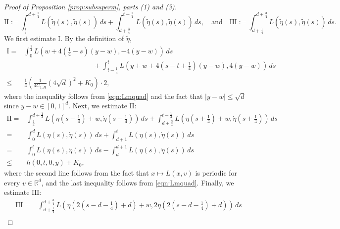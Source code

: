 \documentclass[reqno,11pt]{amsart}
\numberwithin{equation}{section}
\newcommand{\R}{\mathbb{R}} %
\begin{document}
\begin{proof}[Proof of Proposition \ref{prop:subsuperm}, parts (1) and (3)]
\[
\mathrm{II}:= \int_\frac{1}{4}^{d+\frac{1}{4}} L\left(\tilde{\eta}(s), \dot{\tilde{\eta}} (s)\right) \, ds+\int_{d+\frac{3}{4}}^{t-\frac{1}{4}}L\left(\tilde{\eta}(s), \dot{\tilde{\eta}} (s)\right) \, ds, \quad \text{and} \quad \mathrm{III}:=\int_{d+\frac{1}{4}}^{d+\frac{3}{4}}L\left(\tilde{\eta}(s), \dot{\tilde{\eta}} (s)\right) \, ds.
\]
We first estimate $\mathrm{I}$. By the definition of $\tilde{\eta}$,
\begin{equation}\label{eqn:tilxiIest}
\begin{aligned}
\mathrm{I} = &\int_0^\frac{1}{4} L\left(w+ 4\left(\frac{1}{4}-s\right)(y-w), -4(y-w)\right)\, ds\\
&\qquad \qquad\qquad\qquad\qquad +\int_{t-\frac{1}{4}}^t L\left(y+w +4\left(s-t+\frac{1}{4}\right)\left(y-w\right), 4(y-w)\right)\, ds\\
\leq &\frac{1}{4}  \left(\frac{1}{4C_{1,H}}\left(4 \sqrt{d}\right)^2+K_0\right)\cdot 2,
\end{aligned}
\end{equation}
where the inequality follows from \eqref{eqn:Lmquad} and the fact that $|y-w| \leq \sqrt{d}$ since $y-w \in [0, 1]^d$.
Next, we estimate $\mathrm{II}$:
\begin{equation}\label{eqn:tilxiIIest}
\begin{aligned}
\mathrm{II} =&\int_\frac{1}{4}^{d+\frac{1}{4}} L\left(\eta \left(s -\frac{1}{4}\right) +w, \dot{\eta} \left(s -\frac{1}{4}\right)\right)\, ds +\int_{d+\frac{3}{4}}^{t-\frac{1}{4}} L\left(\eta \left(s+\frac{1}{4}\right)+w, \dot{\eta} \left(s +\frac{1}{4}\right)\right)\, ds\\
= & \int_0^d L \left(\eta(s), \dot{\eta}(s)\right) \, ds+ \int_{d+1}^t L\left(\eta \left(s\right), \dot{\eta} \left(s \right)\right)\, ds\\
=& \int_0^t  L \left(\eta(s), \dot{\eta}(s)\right) \, ds - \int_d^{d+1}L\left(\eta \left(s\right), \dot{\eta} \left(s \right)\right)\, ds\\
\leq & h(0,t,0,y) +K_0,
\end{aligned}
\end{equation}
where the second line follows from the fact that $ x \mapsto L(x , v)$ is periodic for every $v \in \R^d$, and the last inequality follows from \eqref{eqn:Lmquad}. Finally, we estimate $\mathrm{III}$:
\begin{equation}\label{eqn:tilxiIIIest}
\begin{aligned}
\mathrm{III} = &\int_{d+\frac{1}{4}}^{d+\frac{3}{4}}L\left(\eta\left(2\left(s-d-\frac{1}{4}\right)+d\right)+w, 2\dot{\eta}\left(2\left(s-d-\frac{1}{4}\right)+d\right)\right) \, ds\\

\end{aligned}
\end{equation}
\end{proof}
\end{document}
